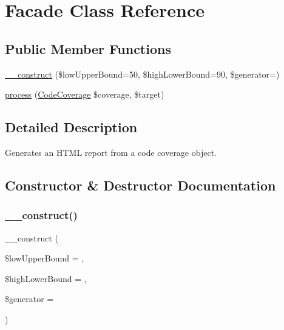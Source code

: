 \hypertarget{class_sebastian_bergmann_1_1_code_coverage_1_1_report_1_1_html_1_1_facade}{}\section{Facade Class Reference}
\label{class_sebastian_bergmann_1_1_code_coverage_1_1_report_1_1_html_1_1_facade}
\subsection*{Public Member Functions}
\begin{DoxyCompactItemize}
\item 
\mbox{\hyperlink{class_sebastian_bergmann_1_1_code_coverage_1_1_report_1_1_html_1_1_facade_a02b424d564684a46c58dec13447dfce1}{\+\_\+\+\_\+construct}} (\$low\+Upper\+Bound=50, \$high\+Lower\+Bound=90, \$generator=\textquotesingle{}\textquotesingle{})
\item 
\mbox{\hyperlink{class_sebastian_bergmann_1_1_code_coverage_1_1_report_1_1_html_1_1_facade_aa875bac5b03446780ea0dcfc181594b0}{process}} (\mbox{\hyperlink{class_sebastian_bergmann_1_1_code_coverage_1_1_code_coverage}{Code\+Coverage}} \$coverage, \$target)
\end{DoxyCompactItemize}


\subsection{Detailed Description}
Generates an H\+T\+ML report from a code coverage object. 

\subsection{Constructor \& Destructor Documentation}
\mbox{\label{class_sebastian_bergmann_1_1_code_coverage_1_1_report_1_1_html_1_1_facade_a02b424d564684a46c58dec13447dfce1}} 
\subsubsection{\texorpdfstring{\+\_\+\+\_\+construct()}{\_\_construct()}}
{\footnotesize\ttfamily \+\_\+\+\_\+construct (\begin{DoxyParamCaption}\item[{}]{\$low\+Upper\+Bound = {},  }\item[{}]{\$high\+Lower\+Bound = {},  }\item[{}]{\$generator = {\ttfamily \textquotesingle{}\textquotesingle{}} }\end{DoxyParamCaption})}

